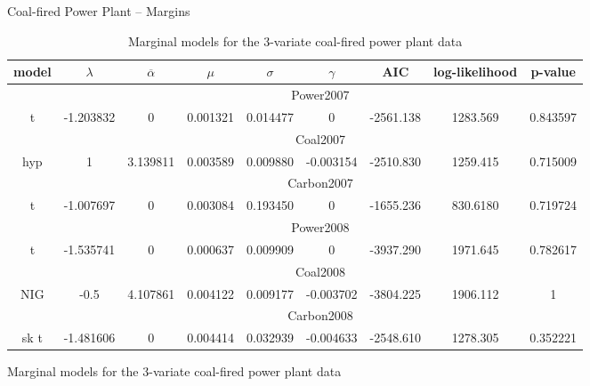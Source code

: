 \begin{figure}[htp]
 Coal-fired Power Plant -- Margins {\tiny{}}
\begin{table}[ht]
\centering{}{\tiny{}}%
\begin{tabular}{c|c|c|c|c|c|c|c|c}
{\tiny{model}} & {\tiny{$\lambda$}} & {\tiny{$\overline{\alpha}$}} & {\tiny{$\mu$}} & {\tiny{$\sigma$}} & {\tiny{$\gamma$}} & {\tiny{AIC}} & {\tiny{log-likelihood}} & {\tiny{p-value}}\tabularnewline
\hline 
 & \multicolumn{8}{c}{{\tiny{Power2007}}}\tabularnewline
\hline 
{\tiny{t}} & {\tiny{-1.203832}} & {\tiny{0}} & {\tiny{0.001321}} & {\tiny{0.014477}} & {\tiny{0}} & {\tiny{-2561.138}} & {\tiny{1283.569}} & {\tiny{0.843597}}\tabularnewline
\hline 
 & \multicolumn{8}{c}{{\tiny{Coal2007}}}\tabularnewline
\hline 
{\tiny{hyp}} & {\tiny{1}} & {\tiny{3.139811}} & {\tiny{0.003589}} & {\tiny{0.009880}} & {\tiny{-0.003154}} & {\tiny{-2510.830}} & {\tiny{1259.415}} & {\tiny{0.715009}}\tabularnewline
\hline 
 & \multicolumn{8}{c}{{\tiny{Carbon2007}}}\tabularnewline
\hline 
{\tiny{t}} & {\tiny{-1.007697}} & {\tiny{0}} & {\tiny{0.003084}} & {\tiny{0.193450}} & {\tiny{0}} & {\tiny{-1655.236}} & {\tiny{830.6180}} & {\tiny{0.719724}}\tabularnewline
\hline 
 & \multicolumn{8}{c}{{\tiny{Power2008}}}\tabularnewline
\hline 
{\tiny{t}} & {\tiny{-1.535741}} & {\tiny{0}} & {\tiny{0.000637}} & {\tiny{0.009909}} & {\tiny{0}} & {\tiny{-3937.290}} & {\tiny{1971.645}} & {\tiny{0.782617}}\tabularnewline
\hline 
 & \multicolumn{8}{c}{{\tiny{Coal2008}}}\tabularnewline
\hline 
{\tiny{NIG}} & {\tiny{-0.5}} & {\tiny{4.107861}} & {\tiny{0.004122}} & {\tiny{0.009177}} & {\tiny{-0.003702}} & {\tiny{-3804.225}} & {\tiny{1906.112}} & {\tiny{1}}\tabularnewline
\hline 
 & \multicolumn{8}{c}{{\tiny{Carbon2008}}}\tabularnewline
\hline 
{\tiny{sk t}} & {\tiny{-1.481606}} & {\tiny{0}} & {\tiny{0.004414}} & {\tiny{0.032939}} & {\tiny{-0.004633}} & {\tiny{-2548.610}} & {\tiny{1278.305}} & {\tiny{0.352221}}\tabularnewline
\hline 
\end{tabular}{\tiny{\caption{{\tiny{Marginal models for the 3-variate coal-fired power plant data}}}
}}
\end{table}
{\tiny \par}


\end{figure}
